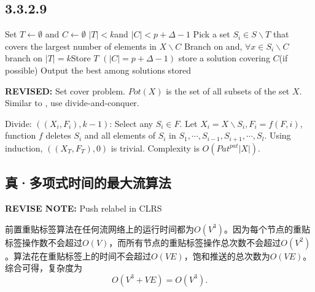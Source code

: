 \documentclass[twocolumn, 10.5pt]{article}
\begin{document}
	\subsection*{3.3.2.9}
	\begin{codebox}
		\li{}\li 
		Set $T\gets\emptyset$ and $C\gets \emptyset$\li 
		\If $|T| < k$and $|C| < p + \Delta − 1$ \li 
		\Then Pick a set $S_i \in S \backslash T $ that covers the largest \zi number of elements in
		$X \backslash C$\li 
		Branch on  and, \zi $\forall x\in S_i \backslash C$ branch on \li 
		\Else\li  
		\If  $|T| = k$\li \Then Store $T$\li 
		\Else\li 
		$(|C| = p + \Delta − 1)$ store a solution covering $C$\zi (if possible)\End\End\li 
		Output the best among solutions stored
	\end{codebox}
	\textbf{REVISED: }Set cover problem. $Pot(X)$ is the set of all subsets of the set $X$. Similar to , use divide-and-conquer.\par 
	Divide: $((X_i,F_i),k-1)$: Select any $S_i\in F$. Let $X_i=X\backslash S_i,F_i=f(F,i)$, function $f$ deletes $S_i$ and all elements of $S_i$ in $S_1,\cdots,S_{i-1},S_{i+1},\cdots, S_l$. Using induction, $((X_T,F_T),0)$ is trivial. Complexity is $O(Pat^{pat}|X|)$.
	\subsection*{真·多项式时间的最大流算法}
	\textbf{REVISE NOTE: }Push relabel in CLRS\par 
	前置重贴标签算法在任何流网络上的运行时间都为$O(V^3)$。因为每个节点的重贴标签操作数不会超过$O(V)$，而所有节点的重贴标签操作总次数不会超过$O(V^2)$。算法花在重贴标签上的时间不会超过$O(VE)$，饱和推送的总次数为$O(VE)$。综合可得，复杂度为$$O(V^3+VE)=O(V^3).$$
\end{document}

